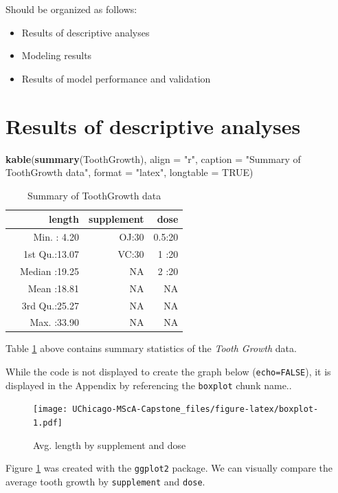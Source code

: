 \documentclass[12pt,oneside]{chicagocapstone}
\newenvironment{Shaded}{\begin{snugshade}}{\end{snugshade}}
\newcommand{\DataTypeTok}[1]{\textcolor[rgb]{0.13,0.29,0.53}{#1}}
\newcommand{\KeywordTok}[1]{\textcolor[rgb]{0.13,0.29,0.53}{\textbf{#1}}}
\newcommand{\NormalTok}[1]{#1}
\newcommand{\OtherTok}[1]{\textcolor[rgb]{0.56,0.35,0.01}{#1}}
\newcommand{\StringTok}[1]{\textcolor[rgb]{0.31,0.60,0.02}{#1}}
\providecommand{\tightlist}{%
  \setlength{\itemsep}{0pt}\setlength{\parskip}{0pt}}
\begin{document}
Should be organized as follows:
\begin{itemize}
\tightlist
\item
  Results of descriptive analyses
\item
  Modeling results
\item
  Results of model performance and validation
\end{itemize}
\hypertarget{findings-descriptive}{%
\section*{Results of descriptive analyses}\label{findings-descriptive}}
\begin{Shaded}
\begin{Highlighting}[]
\KeywordTok{kable}\NormalTok{(}\KeywordTok{summary}\NormalTok{(ToothGrowth), }\DataTypeTok{align =} \StringTok{"r"}\NormalTok{, }\DataTypeTok{caption =} \StringTok{"Summary of ToothGrowth data"}\NormalTok{,}
      \DataTypeTok{format =} \StringTok{"latex"}\NormalTok{, }\DataTypeTok{longtable =} \OtherTok{TRUE}\NormalTok{)}
\end{Highlighting}
\end{Shaded}
\begin{longtable}[t]{l|r|r|r}
\caption{\label{tab:summary}Summary of ToothGrowth data}\\
\hline
  &     length & supplement &  dose\\
\hline
 & Min.   : 4.20 & OJ:30 & 0.5:20\\
\hline
 & 1st Qu.:13.07 & VC:30 & 1  :20\\
\hline
 & Median :19.25 & NA & 2  :20\\
\hline
 & Mean   :18.81 & NA & NA\\
\hline
 & 3rd Qu.:25.27 & NA & NA\\
\hline
 & Max.   :33.90 & NA & NA\\
\hline
\end{longtable}
Table \ref{tab:summary} above contains summary statistics of the \emph{Tooth Growth} data.

While the code is not displayed to create the graph below (\texttt{echo=FALSE}), it is displayed in the Appendix by referencing the \texttt{boxplot} chunk name..
\begin{figure}
\centering
\texttt{[image: UChicago-MScA-Capstone\_files/figure-latex/boxplot-1.pdf]}
\caption{\label{fig:boxplot}Avg. length by supplement and dose}
\end{figure}
Figure \ref{fig:boxplot} was created with the \texttt{ggplot2} package. We can visually compare the average tooth growth by \texttt{supplement} and \texttt{dose}.
\end{document}
